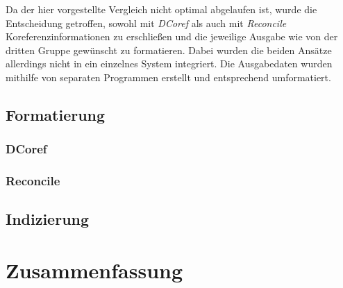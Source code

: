 \documentclass[a4paper,12pt,titlepage=true, ngerman]{scrartcl}
\begin{document}
Da der hier vorgestellte Vergleich nicht optimal abgelaufen ist, wurde die Entscheidung getroffen, 
sowohl mit \emph{DCoref} als auch mit \emph{Reconcile} Koreferenzinformationen zu erschließen 
und die jeweilige Ausgabe wie von der dritten Gruppe gewünscht zu formatieren. 
Dabei wurden die beiden Ansätze allerdings nicht in ein einzelnes System integriert. 
Die Ausgabedaten wurden mithilfe von separaten Programmen erstellt und entsprechend umformatiert.



\subsection{Formatierung}\label{Verlauf:Formatierung}%



\subsubsection{DCoref}%





\subsubsection{Reconcile}




\subsection{Indizierung}\label{Indizierung}




\newpage

\section{Zusammenfassung}%


\end{document}
